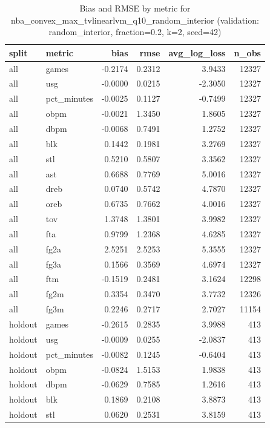 \begin{table}
\caption{Bias and RMSE by metric for nba_convex_max_tvlinearlvm_q10_random_interior (validation: random_interior, fraction=0.2, k=2, seed=42)}
\label{tab:nba_convex_max_tvlinearlvm_q10_random_interior_vs_random_interior_f20_k2_s42_bias_rmse}
\begin{tabular}{llrrrr}
\toprule
split & metric & bias & rmse & avg\_log\_loss & n\_obs \\
\midrule
all & games & -0.2174 & 0.2312 & 3.9433 & 12327 \\
all & usg & -0.0000 & 0.0215 & -2.3050 & 12327 \\
all & pct\_minutes & -0.0025 & 0.1127 & -0.7499 & 12327 \\
all & obpm & -0.0021 & 1.3450 & 1.8605 & 12327 \\
all & dbpm & -0.0068 & 0.7491 & 1.2752 & 12327 \\
all & blk & 0.1442 & 0.1981 & 3.2769 & 12327 \\
all & stl & 0.5210 & 0.5807 & 3.3562 & 12327 \\
all & ast & 0.6688 & 0.7769 & 5.0016 & 12327 \\
all & dreb & 0.0740 & 0.5742 & 4.7870 & 12327 \\
all & oreb & 0.6735 & 0.7662 & 4.0016 & 12327 \\
all & tov & 1.3748 & 1.3801 & 3.9982 & 12327 \\
all & fta & 0.9799 & 1.2368 & 4.6285 & 12327 \\
all & fg2a & 2.5251 & 2.5253 & 5.3555 & 12327 \\
all & fg3a & 0.1566 & 0.3569 & 4.6974 & 12327 \\
all & ftm & -0.1519 & 0.2481 & 3.1624 & 12298 \\
all & fg2m & 0.3354 & 0.3470 & 3.7732 & 12326 \\
all & fg3m & 0.2246 & 0.2717 & 2.7027 & 11154 \\
holdout & games & -0.2615 & 0.2835 & 3.9988 & 413 \\
holdout & usg & -0.0009 & 0.0255 & -2.0837 & 413 \\
holdout & pct\_minutes & -0.0082 & 0.1245 & -0.6404 & 413 \\
holdout & obpm & -0.0824 & 1.5153 & 1.9838 & 413 \\
holdout & dbpm & -0.0629 & 0.7585 & 1.2616 & 413 \\
holdout & blk & 0.1869 & 0.2108 & 3.8873 & 413 \\
holdout & stl & 0.0620 & 0.2531 & 3.8159 & 413 \\

\end{tabular}
\end{table}
